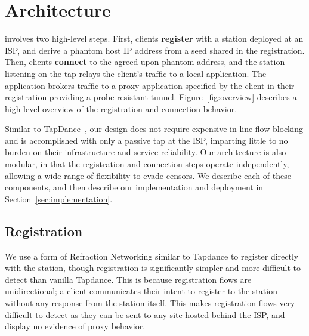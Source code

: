 \documentclass[sigconf]{acmart}
\begin{document}


\section{Architecture}
\label{sec:architecture}

\scheme involves two high-level steps. First, clients \textbf{register} with a 
\scheme station deployed at an ISP, and derive a phantom host IP address from 
a seed shared in the registration. Then, clients \textbf{connect} 
to the agreed upon phantom address, and the station listening on the tap 
relays the client's traffic to a local application. The application brokers 
traffic to a proxy application specified by the client in their registration 
providing a probe resistant tunnel. Figure~\ref{fig:overview} describes a 
high-level overview of the \scheme registration and connection behavior.

Similar to TapDance~\cite{tapdance14}, our design does not require expensive in-line
flow blocking and is accomplished with only a passive tap at the ISP, imparting
little to no burden on their infrastructure and service reliability.
Our architecture is also modular, in that the registration and connection steps operate
independently, allowing a wide range of flexibility to evade censors. We
describe each of these components, and then describe our implementation and
deployment in Section~\ref{sec:implementation}.

\FigOverview

\subsection{Registration}
\label{sec:registration}
We use a form of Refraction Networking similar to Tapdance to register directly with
the station, though \scheme registration is significantly simpler and more difficult
to detect than vanilla Tapdance. This is because registration flows are unidirectional; 
a client communicates their intent to register to the station without any 
response from the station itself. This makes registration flows very difficult to detect as they 
can be sent to any site hosted behind the ISP, and display no evidence of proxy behavior. 
\end{document}
